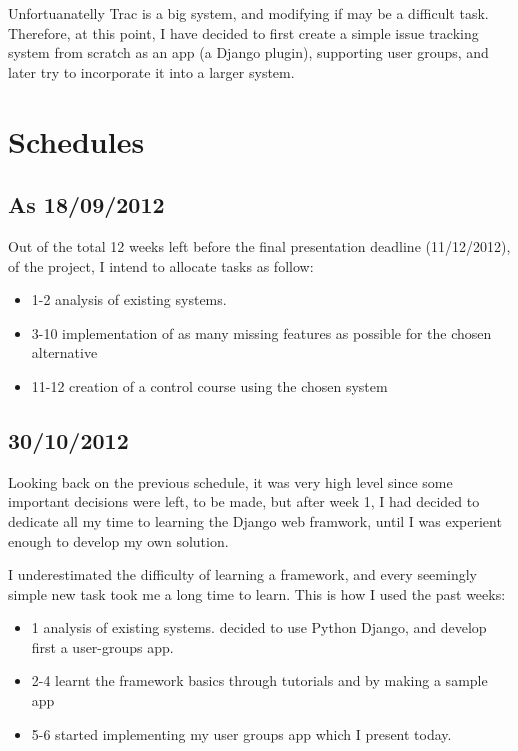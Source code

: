 \documentclass[12pt]{article}
\begin{document}
Unfortuanatelly Trac is a big system, and modifying if may be a difficult task. Therefore, at this point, I have decided to first create a simple issue tracking system from scratch as an app (a Django plugin), supporting user groups, and later try to incorporate it into a larger system.

\section{Schedules} \label{schedules}

\subsection{As 18/09/2012}

Out of the total 12 weeks left before the final presentation deadline (11/12/2012), of the project, I intend to allocate tasks as follow:

\begin{itemize}
  \item 1-2 analysis of existing systems.
  \item 3-10 implementation of as many missing features as possible for the chosen alternative
  \item 11-12 creation of a control course using the chosen system
\end{itemize}

\subsection{30/10/2012}

Looking back on the previous schedule, it was very high level since some important decisions were left,
to be made, but after week 1, I had decided to dedicate all my time to learning the Django web framwork,
until I was experient enough to develop my own solution.

I underestimated the difficulty of learning a framework, and every seemingly
simple new task took me a long time to learn. This is how I used the past weeks:

\begin{itemize}
  \item 1 analysis of existing systems. decided to use Python Django, and develop first a user-groups app.
  \item 2-4 learnt the framework basics through tutorials and by making a sample app
  \item 5-6 started implementing my user groups app which I present today.
\end{itemize}
\end{document}
